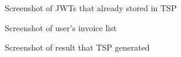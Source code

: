 \begin{figure}[htb]
    \centering
    \caption{{\footnotesize Screenshot of JWTs that already stored in TSP}}
    \label{fig:sreenshotJWT}
\end{figure}

\begin{figure}[htb]
    \centering
    \caption{{\footnotesize Screenshot of user's invoice list}}
    \label{fig:invoicelist}
\end{figure}

\begin{figure}[htb]
    \centering
    \caption{{\footnotesize Screenshot of result that TSP generated}}
    \label{fig:result}
\end{figure}